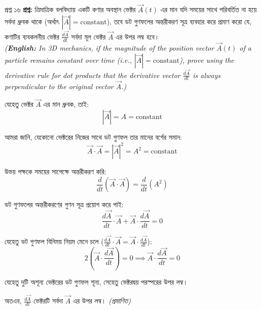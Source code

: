 \documentclass[11pt,a4paper]{article}
\begin{document}
\vspace{0.4cm}

\begin{qbox}{প্রশ্ন ১৬}
\textbf{প্রশ্ন:} ত্রিমাত্রিক বলবিদ্যায় একটি কণার অবস্থান ভেক্টর $\vec{A}(t)$ এর মান যদি সময়ের সাথে পরিবর্তিত না হয়ে সর্বদা ধ্রুবক থাকে (অর্থাৎ $|\vec{A}| = \text{constant}$), তবে ডট গুণফলের অন্তরীকরণ সূত্র ব্যবহার করে প্রমাণ করো যে, কণাটির ব্যবকলনীয় ভেক্টর $\frac{d\vec{A}}{dt}$ সর্বদা মূল ভেক্টর $\vec{A}$ এর উপর লম্ব হবে। \\
\textit{(\textbf{English:} In 3D mechanics, if the magnitude of the position vector $\vec{A}(t)$ of a particle remains constant over time (i.e., $|\vec{A}| = \text{constant}$), prove using the derivative rule for dot products that the derivative vector $\frac{d\vec{A}}{dt}$ is always perpendicular to the original vector $\vec{A}$.)}
\end{qbox}

\begin{solbox}
যেহেতু ভেক্টর $\vec{A}$ এর মান ধ্রুবক, তাই:
$$|\vec{A}| = A = \text{constant}$$

আমরা জানি, যেকোনো ভেক্টরের নিজের সাথে ডট গুণফল তার মানের বর্গের সমান:
$$\vec{A} \cdot \vec{A} = |\vec{A}|^2 = A^2 = \text{constant}$$

উভয় পক্ষকে সময়ের সাপেক্ষে অন্তরীকরণ করি:
$$\frac{d}{dt}(\vec{A} \cdot \vec{A}) = \frac{d}{dt}(A^2)$$

ডট গুণফলের অন্তরীকরণের গুণন সূত্র প্রয়োগ করে পাই:
$$\frac{d\vec{A}}{dt} \cdot \vec{A} + \vec{A} \cdot \frac{d\vec{A}}{dt} = 0$$

যেহেতু ডট গুণফল বিনিময় নিয়ম মেনে চলে ($\frac{d\vec{A}}{dt} \cdot \vec{A} = \vec{A} \cdot \frac{d\vec{A}}{dt}$):
$$2\left(\vec{A} \cdot \frac{d\vec{A}}{dt}\right) = 0 \implies \vec{A} \cdot \frac{d\vec{A}}{dt} = 0$$

যেহেতু দুটি অশূন্য ভেক্টরের ডট গুণফল শূন্য, সেহেতু ভেক্টরদ্বয় পরস্পরের উপর লম্ব।

অতএব, $\frac{d\vec{A}}{dt}$ ভেক্টরটি সর্বদা $\vec{A}$ এর উপর লম্ব। \hfill \textit{(প্রমাণিত)}
\end{solbox}

\vspace{0.4cm}
\end{document}
